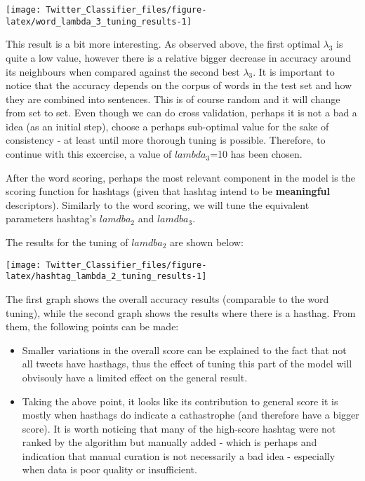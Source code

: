 \documentclass[11pt,]{article}
\providecommand{\tightlist}{%
  \setlength{\itemsep}{0pt}\setlength{\parskip}{0pt}}
\begin{document}
\begin{center}\texttt{[image: Twitter\_Classifier\_files/figure-latex/word\_lambda\_3\_tuning\_results-1]} \end{center}

This result is a bit more interesting. As observed above, the first
optimal \(\lambda_3\) is quite a low value, however there is a relative
bigger decrease in accuracy around its neighbours when compared against
the second best \(\lambda_3\). It is important to notice that the
accuracy depends on the corpus of words in the test set and how they are
combined into sentences. This is of course random and it will change
from set to set. Even though we can do cross validation, perhaps it is
not a bad a idea (as an initial step), choose a perhaps sub-optimal
value for the sake of consistency - at least until more thorough tuning
is possible. Therefore, to continue with this excercise, a value of
\(lambda_3\)=10 has been chosen.

After the word scoring, perhaps the most relevant component in the model
is the scoring function for hashtags (given that hashtag intend to be
\textbf{meaningful} descriptors). Similarly to the word scoring, we will
tune the equivalent parameters hashtag's \(lamdba_2\) and \(lamdba_3\).

The results for the tuning of \(lamdba_2\) are shown below:

\begin{center}\texttt{[image: Twitter\_Classifier\_files/figure-latex/hashtag\_lambda\_2\_tuning\_results-1]} \end{center}

The first graph shows the overall accuracy results (comparable to the
word tuning), while the second graph shows the results where there is a
hasthag. From them, the following points can be made:

\begin{itemize}
\tightlist
\item
  Smaller variations in the overall score can be explained to the fact
  that not all tweets have hasthags, thus the effect of tuning this part
  of the model will obvisouly have a limited effect on the general
  result.
\item
  Taking the above point, it looks like its contribution to general
  score it is mostly when hasthags do indicate a cathastrophe (and
  therefore have a bigger score). It is worth noticing that many of the
  high-score hashtag were not ranked by the algorithm but manually added
  - which is perhaps and indication that manual curation is not
  necessarily a bad idea - especially when data is poor quality or
  insufficient.
\end{itemize}
\end{document}
